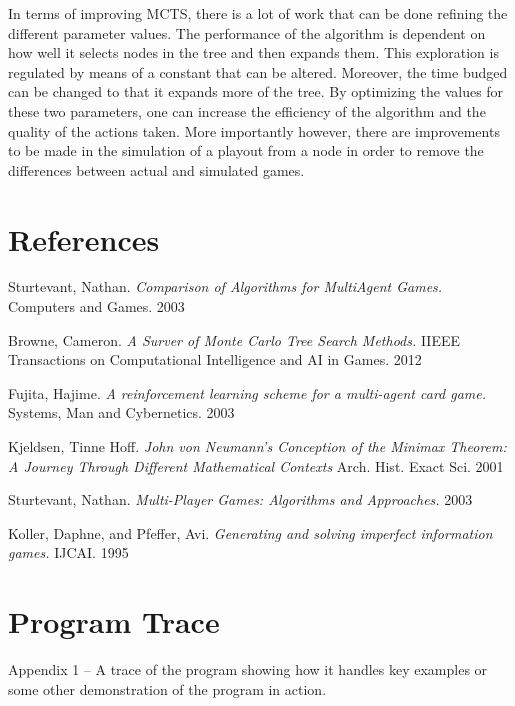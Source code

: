 \documentclass[11pt]{article}
\begin{document}
In terms of improving MCTS, there is a lot of work that can be done refining the different parameter values. The performance of the algorithm is dependent on how well it selects nodes in the tree and then expands them. This exploration is regulated by means of a constant that can be altered. Moreover, the time budged can be changed to that it expands more of the tree. By optimizing the values for these two parameters, one can increase the efficiency of the algorithm and the quality of the actions taken. More importantly however, there are improvements to be made in the simulation of a playout from a node in order to remove the differences between actual and simulated games.

\section{References}

\begin{thebibliography}{5}

	Sturtevant, Nathan.
	\emph{Comparison of Algorithms for MultiAgent Games.}
	Computers and Games.
	2003

	Browne, Cameron.
	\emph{A Surver of Monte Carlo Tree Search Methods.}
	IIEEE Transactions on Computational Intelligence and AI in Games. 
	2012

	Fujita, Hajime.
	\emph{A reinforcement learning scheme for a multi-agent card game.}
	Systems, Man and Cybernetics.
	2003

	Kjeldsen, Tinne Hoff.
	\emph{John von Neumann’s Conception of the Minimax Theorem: A Journey Through Different Mathematical Contexts}
	Arch. Hist. Exact Sci.
	2001
	
	Sturtevant, Nathan.
	\emph{Multi-Player Games: Algorithms and Approaches.}
	2003
	
	Koller, Daphne, and Pfeffer, Avi.
	\emph{Generating and solving imperfect information games.}
	IJCAI.
	1995
	
\end{thebibliography}

\appendix

\section{Program Trace}

Appendix 1 – A trace of the program showing how it handles key examples or some other demonstration of the program in action.
\end{document}
